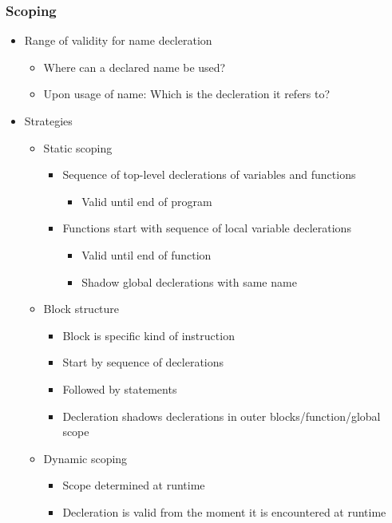 \documentclass{scrartcl}
\begin{document}
\subsubsection{Scoping}

\begin{itemize}
	\item Range of validity for name decleration
	\begin{itemize}
		\item Where can a declared name be used?
		\item Upon usage of name: Which is the decleration it refers to?
	\end{itemize}
	\item Strategies
	\begin{itemize}
		\item Static scoping
		\begin{itemize}
			\item Sequence of top-level declerations of variables and functions
			\begin{itemize}
				\item Valid until end of program
			\end{itemize}
			\item Functions start with sequence of local variable declerations
			\begin{itemize}
				\item Valid until end of function
				\item Shadow global declerations with same name
			\end{itemize}
		\end{itemize}
		\item Block structure
		\begin{itemize}
			\item Block is specific kind of instruction
			\item Start by sequence of declerations
			\item Followed by statements
			\item Decleration shadows declerations in outer blocks/function/global scope
		\end{itemize}
		\item Dynamic scoping
		\begin{itemize}
			\item Scope determined at runtime
			\item Decleration is valid from the moment it is encountered at runtime
		\end{itemize}
	\end{itemize}
\end{itemize}
\end{document}
